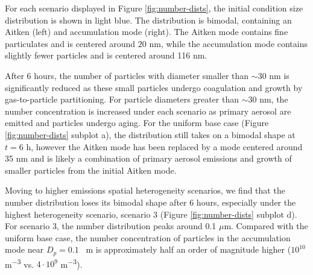 For each scenario displayed in Figure \ref{fig:number-dists}, the initial condition size distribution is shown in light blue. The distribution is bimodal, containing an Aitken (left) and accumulation mode (right). The Aitken mode contains fine particulates and is centered around $20$ nm, while the accumulation mode contains slightly fewer particles and is centered around 116 nm. 

After 6 hours, the number of particles with diameter smaller than $\sim30$ nm is significantly reduced as these small particles undergo coagulation and growth by gas-to-particle partitioning. For particle diameters greater than $\sim30$ nm, the number concentration is increased under each scenario as primary aerosol are emitted and particles undergo aging. For the uniform base case (Figure \ref{fig:number-dists} subplot a), the distribution still takes on a bimodal shape at $t=6$ h, however the Aitken mode has been replaced by a mode centered around 35 nm and is likely a combination of primary aerosol emissions and growth of smaller particles from the initial Aitken mode. 

Moving to higher emissions spatial heterogeneity scenarios, we find that the number distribution loses its bimodal shape after 6 hours, especially under the highest heterogeneity scenario, scenario 3 (Figure \ref{fig:number-dists} subplot d). For scenario 3, the number distribution peaks around 0.1 $\mu$m. Compared with the uniform base case, the number concentration of particles in the accumulation mode near $D_p = 0.1$ \si{\mu m} is approximately half an order of magnitude higher ($10^{10}$ \si{m^{-3}} vs. $4\cdot10^9$ \si{m^{-3}}).

